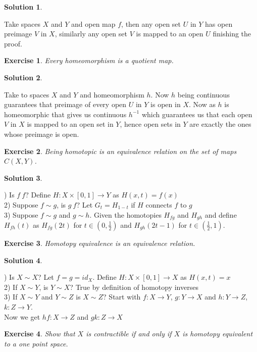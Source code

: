 \documentclass[11pt,a4paper]{article}
\newtheorem{Ex}{Exercise}
\newtheorem{Sol}{Solution}
\newcommand{\ra}{\rightarrow}
\begin{document}
\begin{Sol}\end{Sol}
\noindent Take spaces $X$ and $Y$ and open map $f$, then any open set $U$ in $Y$ has open preimage $V$ in $X$, similarly any open set $V$ is mapped to an open $U$ finishing the proof.

\begin{Ex}
	Every homeomorphism is a quotient map.
\end{Ex}

\begin{Sol}\end{Sol}
Take to spaces $X$ and $Y$ and homeomorphism $h$. Now $h$ being continuous guarantees that preimage of every open $U$ in $Y$ is open in $X$. Now as $h$ is homeomorphic that gives us continuous $h^{-1}$ which guarantees us that each open $V$ in $X$ is mapped to an open set in $Y$, hence open sets in $Y$ are exactly the ones whose preimage is open.    

\begin{Ex}
	Being homotopic is an equivalence relation on the set of maps $C(X,Y)$.
\end{Ex}
\begin{Sol}\end{Sol}
) Is $f~f$? Define $H: X \times [0,1] \rightarrow Y$ as $H(x,t) = f(x)$ \\
2) Suppose $f \sim g$, is $g~f$? Let $G_t = H_{1-t}$ if $H$ connects $f$ to $g$ \\
3) Suppose $f \sim g$ and $g \sim h$. Given the homotopies $H_{fg}$ and $H_{gh}$ and define $H_{fh}(t)$ as $H_{fg}(2t)$ for $t \in (0,\frac{1}{2})$ and $H_{gh}(2t-1)$ for $t\in (\frac{1}{2},1)$.    

\begin{Ex}
	Homotopy equivalence is an equivalence relation.
\end{Ex}

\begin{Sol}\end{Sol}
) Is $X\sim X$? Let $f = g = id_X$. Define $H: X \times [0,1] \rightarrow X$ as $H(x,t)=x$ \\
2) If $X \sim Y$, is $Y \sim X$? True by definition of homotopy inverses \\
3) If $X \sim Y$ and $Y \sim Z$ is $X \sim Z$? Start with $f: X \ra Y$, $g : Y \ra X$ and $h: Y \ra Z$, $k: Z \ra Y$. \\ 
Now we get $hf: X \ra Z$ and $gk: Z \ra X$

\begin{Ex}
	Show that $X$ is contractible if and only if $X$ is homotopy equivalent to a one point space.
\end{Ex} 
\end{document}
